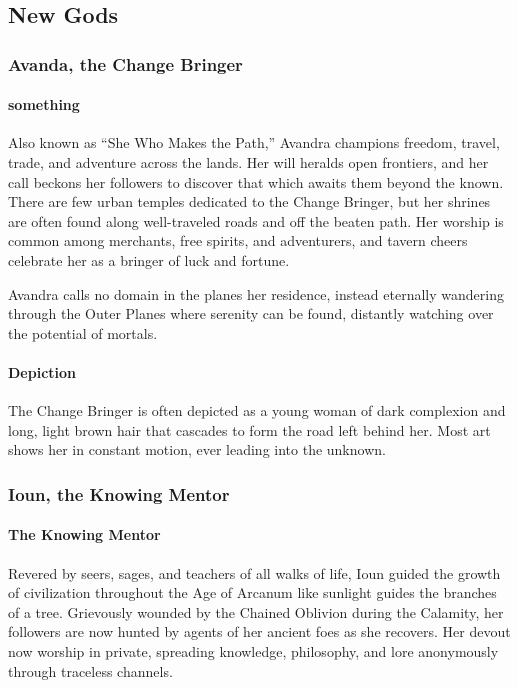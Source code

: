 \documentclass[letterpaper,twocolumn,openany,nodeprecatedcode]{dndbook}
\begin{document}
\subsection{New Gods}

\subsubsection{Avanda, the Change Bringer}

\paragraph{something}
Also known as “She Who Makes the Path,” Avandra champions freedom, travel, trade, and
adventure across the lands. Her will heralds open frontiers, and her call beckons her
followers to discover that which awaits them beyond the known. There are few urban temples
dedicated to the Change Bringer, but her shrines are often found along well-traveled roads
and off the beaten path. Her worship is common among merchants, free spirits, and adventurers,
and tavern cheers celebrate her as a bringer of luck and fortune.

Avandra calls no domain in the planes her residence, instead eternally wandering through the
Outer Planes where serenity can be found, distantly watching over the potential of mortals.

\paragraph{Depiction}
The Change Bringer is often depicted as a young woman of dark complexion and long, light brown
hair that cascades to form the road left behind her. Most art shows her in constant motion,
ever leading into the unknown.

\subsubsection{Ioun, the Knowing Mentor}

\paragraph{The Knowing Mentor}
Revered by seers, sages, and teachers of all walks of life, Ioun guided the growth of
civilization throughout the Age of Arcanum like sunlight guides the branches of a tree.
Grievously wounded by the Chained Oblivion during the Calamity, her followers are now
hunted by agents of her ancient foes as she recovers. Her devout now worship in private,
spreading knowledge, philosophy, and lore anonymously through traceless channels.
\end{document}
